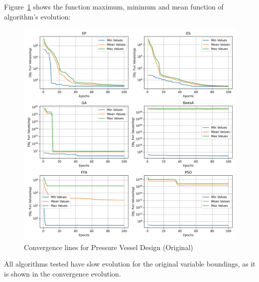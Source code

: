 
Figure~\ref{fig:pressure_vessel_problem_original_convergence} shows the
function maximum, minimum and mean function of algorithm's evolution:

\begin{figure}[H]
\centering
\caption{Convergence lines for Pressure Vessel Design (Original)}
\label{fig:pressure_vessel_problem_original_convergence}
\includegraphics[width=0.4 \textwidth]{images/pressure_vessel_problem_original_convergence.png}
\end{figure}

All algorithms tested have slow evolution for the original variable boundings, as it is shown in the convergence evolution.


